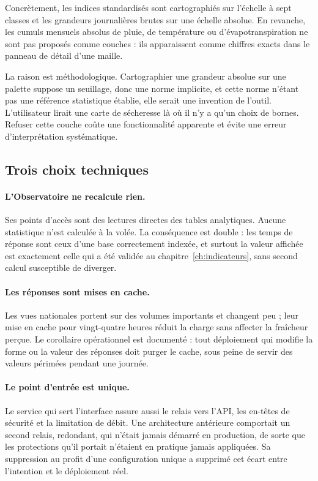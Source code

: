 Concrètement, les indices standardisés sont cartographiés sur l'échelle à sept classes et les
grandeurs journalières brutes sur une échelle absolue. En revanche, les cumuls mensuels absolus
de pluie, de température ou d'évapotranspiration ne sont pas proposés comme couches : ils
apparaissent comme chiffres exacts dans le panneau de détail d'une maille.

La raison est méthodologique. Cartographier une grandeur absolue sur une palette suppose un
seuillage, donc une norme implicite, et cette norme n'étant pas une référence statistique
établie, elle serait une invention de l'outil. L'utilisateur lirait une carte de sécheresse là
où il n'y a qu'un choix de bornes. Refuser cette couche coûte une fonctionnalité apparente et
évite une erreur d'interprétation systématique.

\subsection{Trois choix techniques}

\paragraph{L'Observatoire ne recalcule rien.} Ses points d'accès sont des lectures directes des
tables analytiques. Aucune statistique n'est calculée à la volée. La conséquence est double :
les temps de réponse sont ceux d'une base correctement indexée, et surtout la valeur affichée
est exactement celle qui a été validée au chapitre~\ref{ch:indicateurs}, sans second calcul
susceptible de diverger.

\paragraph{Les réponses sont mises en cache.} Les vues nationales portent sur des volumes
importants et changent peu ; leur mise en cache pour vingt-quatre heures réduit la charge sans
affecter la fraîcheur perçue. Le corollaire opérationnel est documenté : tout déploiement qui
modifie la forme ou la valeur des réponses doit purger le cache, sous peine de servir des
valeurs périmées pendant une journée.

\paragraph{Le point d'entrée est unique.} Le service qui sert l'interface assure aussi le relais
vers l'API, les en-têtes de sécurité et la limitation de débit. Une architecture antérieure
comportait un second relais, redondant, qui n'était jamais démarré en production, de sorte que
les protections qu'il portait n'étaient en pratique jamais appliquées. Sa suppression au profit
d'une configuration unique a supprimé cet écart entre l'intention et le déploiement réel.

